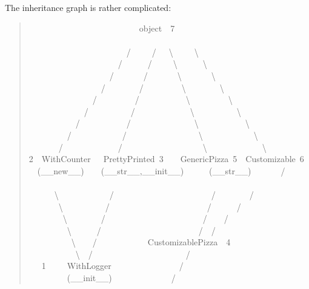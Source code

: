 \documentclass[10pt,english]{article}
\begin{document}
The inheritance graph is rather complicated:
\begin{quote}
\begin{ttfamily}\begin{flushleft}
\mbox{~~~~~~~~~~~~~~~~~~~~~~~~~~object~~7}\\
\mbox{}\\
\mbox{~~~~~~~~~~~~~~~~~~~~~~~/~~~~~/~~~{\textbackslash}~~~~~{\textbackslash}}\\
\mbox{~~~~~~~~~~~~~~~~~~~~~/~~~~~~/~~~~~{\textbackslash}~~~~~~{\textbackslash}}\\
\mbox{~~~~~~~~~~~~~~~~~~~/~~~~~~~/~~~~~~~{\textbackslash}~~~~~~~{\textbackslash}}\\
\mbox{~~~~~~~~~~~~~~~~~/~~~~~~~~/~~~~~~~~~{\textbackslash}~~~~~~~~{\textbackslash}}\\
\mbox{~~~~~~~~~~~~~~~/~~~~~~~~~/~~~~~~~~~~~{\textbackslash}~~~~~~~~~{\textbackslash}}\\
\mbox{~~~~~~~~~~~~~/~~~~~~~~~~/~~~~~~~~~~~~~{\textbackslash}~~~~~~~~~~{\textbackslash}}\\
\mbox{~~~~~~~~~~~/~~~~~~~~~~~/~~~~~~~~~~~~~~~{\textbackslash}~~~~~~~~~~~{\textbackslash}}\\
\mbox{~~~~~~~~~/~~~~~~~~~~~~/~~~~~~~~~~~~~~~~~{\textbackslash}~~~~~~~~~~~~{\textbackslash}}\\
\mbox{~~~~~~~/~~~~~~~~~~~~~/~~~~~~~~~~~~~~~~~~~{\textbackslash}~~~~~~~~~~~~~{\textbackslash}}\\
\mbox{2~~WithCounter~~~PrettyPrinted~3~~~~GenericPizza~5~~Customizable~6}\\
\mbox{~~({\_}{\_}new{\_}{\_})~~~~({\_}{\_}str{\_}{\_},{\_}{\_}init{\_}{\_})~~~~~~({\_}{\_}str{\_}{\_})~~~~~~~/~~~~~~~~~~~~~~}\\
\mbox{~~~~~~{\textbackslash}~~~~~~~~~~~~/~~~~~~~~~~~~~~~~~~~~~~~/~~~~~~~~/~~~~}\\
\mbox{~~~~~~~{\textbackslash}~~~~~~~~~~/~~~~~~~~~~~~~~~~~~~~~~~/~~~~~~/~~~~~~~~~}\\
\mbox{~~~~~~~~{\textbackslash}~~~~~~~~/~~~~~~~~~~~~~~~~~~~~~~~/~~~~/}\\
\mbox{~~~~~~~~~{\textbackslash}~~~~~~/~~~~~~~~~~~~~~~~~~~~~~~/~~/}\\
\mbox{~~~~~~~~~~{\textbackslash}~~~~/~~~~~~~~~~~~CustomizablePizza~~4}\\
\mbox{~~~~~~~~~~~{\textbackslash}~~/~~~~~~~~~~~~~~~~~~~~~~/~~~~~~~}\\
\mbox{~~~1~~~~~WithLogger~~~~~~~~~~~~~~~~/}\\
\mbox{~~~~~~~~~({\_}{\_}init{\_}{\_})~~~~~~~~~~~~~~/~~~~~~~~}\\

\end{flushleft}
\end{ttfamily}
\end{quote}
\end{document}
